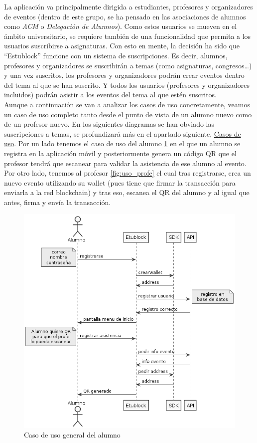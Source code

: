 La aplicación va principalmente dirigida a estudiantes, profesores y organizadores de eventos (dentro de este grupo, se ha pensado en las asociaciones de alumnos como \emph{ACM} o \emph{Delegación de Alumnos}). Como estos usuarios se mueven en el ámbito universitario, se requiere también de una funcionalidad que permita a los usuarios suscribirse a asignaturas. Con esto en mente, la decisión ha sido que ``Estublock'' funcione con un sistema de suscripciones. Es decir, alumnos, profesores y organizadores se suscribirán a temas (como asignaturas, congresos\dots) y una vez suscritos, los profesores y organizadores podrán crear eventos dentro del tema al que se han suscrito. Y todos los usuarios (profesores y organizadores incluidos) podrán asistir a los eventos del tema al que estén suscritos. \\

Aunque a continuación se van a analizar los casos de uso concretamente, veamos un caso de uso completo tanto desde el punto de vista de un alumno nuevo como de un profesor nuevo. En los siguientes diagramas se han obviado las suscripciones a temas, se profundizará más en el apartado siguiente, \hyperref[sec:casosUso]{Casos de uso}. Por un lado tenemos el caso de uso del alumno \ref{fig:uso_alumno} en el que un alumno se registra en la aplicación móvil y posteriormente genera un código QR que el profesor tendrá que escanear para validar la asistencia de ese alumno al evento. Por otro lado, tenemos al profesor \ref{fig:uso_profe} el cual tras registrarse, crea un nuevo evento utilizando su wallet (pues tiene que firmar la transacción para enviarla a la red blockchain) y tras eso, escanea el QR del alumno y al igual que antes, firma y envía la transacción. 

\begin{figure}[h!]
  \centering
  \includegraphics[width=0.4\linewidth]{figs/Desarrollo/CasosUso/generalAlumno}
  \caption[Caso de uso general del alumno]{Caso de uso general del alumno}
  \label{fig:uso_alumno}
\end{figure}

